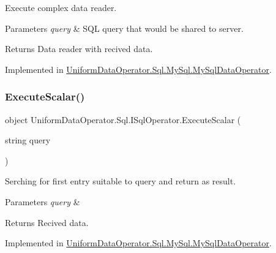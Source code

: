 Execute complex data reader. 


\begin{DoxyParams}{Parameters}
{\em query} & S\+QL query that would be shared to server.\\
\hline
\end{DoxyParams}
\begin{DoxyReturn}{Returns}
Data reader with recived data.
\end{DoxyReturn}


Implemented in \mbox{\hyperlink{class_uniform_data_operator_1_1_sql_1_1_my_sql_1_1_my_sql_data_operator_af268707ebe1917b32e450fb0f50e717d}{Uniform\+Data\+Operator.\+Sql.\+My\+Sql.\+My\+Sql\+Data\+Operator}}.

\mbox{\label{interface_uniform_data_operator_1_1_sql_1_1_i_sql_operator_a0124a73135270fb2b6eb33077f4dd38f}} 
\subsubsection{\texorpdfstring{Execute\+Scalar()}{ExecuteScalar()}}
{\footnotesize\ttfamily object Uniform\+Data\+Operator.\+Sql.\+I\+Sql\+Operator.\+Execute\+Scalar (\begin{DoxyParamCaption}\item[{string}]{query }\end{DoxyParamCaption})}



Serching for first entry suitable to query and return as result. 


\begin{DoxyParams}{Parameters}
{\em query} & \\
\hline
\end{DoxyParams}
\begin{DoxyReturn}{Returns}
Recived data.
\end{DoxyReturn}


Implemented in \mbox{\hyperlink{class_uniform_data_operator_1_1_sql_1_1_my_sql_1_1_my_sql_data_operator_a5d6645ebf8d909cb553dbdf6ab7e9b29}{Uniform\+Data\+Operator.\+Sql.\+My\+Sql.\+My\+Sql\+Data\+Operator}}.

